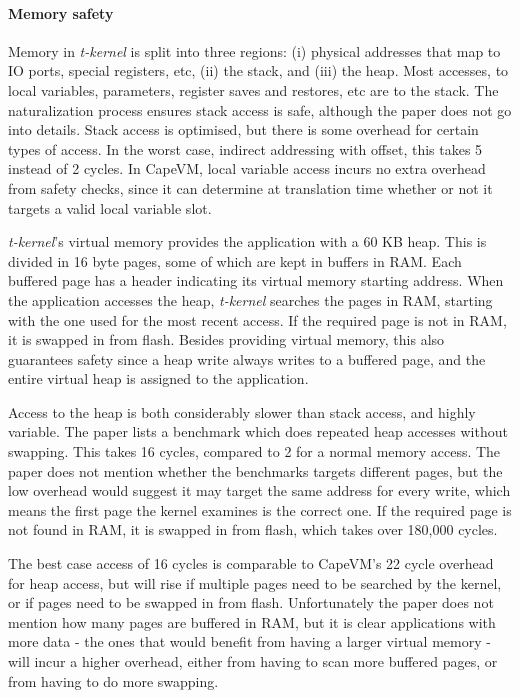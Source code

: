 \paragraph{Memory safety}
Memory in \emph{t-kernel} is split into three regions: (i) physical addresses that map to IO ports, special registers, etc, (ii) the stack, and (iii) the heap. Most accesses, to local variables, parameters, register saves and restores, etc are to the stack. The naturalization process ensures stack access is safe, although the paper does not go into details. Stack access is optimised, but there is some overhead for certain types of access. In the worst case, indirect addressing with offset, this takes 5 instead of 2 cycles. In CapeVM, local variable access incurs no extra overhead from safety checks, since it can determine at translation time whether or not it targets a valid local variable slot.

\emph{t-kernel}'s virtual memory provides the application with a 60 KB heap. This is divided in 16 byte pages, some of which are kept in buffers in RAM. Each buffered page has a header indicating its virtual memory starting address. When the application accesses the heap, \emph{t-kernel} searches the pages in RAM, starting with the one used for the most recent access. If the required page is not in RAM, it is swapped in from flash. Besides providing virtual memory, this also guarantees safety since a heap write always writes to a buffered page, and the entire virtual heap is assigned to the application.

Access to the heap is both considerably slower than stack access, and highly variable. The paper lists a benchmark which does repeated heap accesses without swapping. This takes 16 cycles, compared to 2 for a normal memory access. The paper does not mention whether the benchmarks targets different pages, but the low overhead would suggest it may target the same address for every write, which means the first page the kernel examines is the correct one. If the required page is not found in RAM, it is swapped in from flash, which takes over 180,000 cycles.

The best case access of 16 cycles is comparable to CapeVM's 22 cycle overhead for heap access, but will rise if multiple pages need to be searched by the kernel, or if pages need to be swapped in from flash. Unfortunately the paper does not mention how many pages are buffered in RAM, but it is clear applications with more data - the ones that would benefit from having a larger virtual memory - will incur a higher overhead, either from having to scan more buffered pages, or from having to do more swapping.

